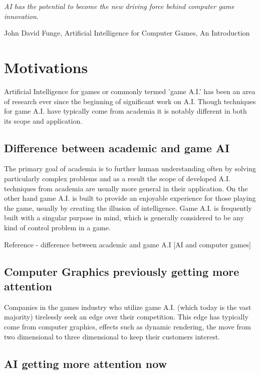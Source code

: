 \documentclass[parskip]{cs4rep}
\begin{document}
\begin{flushleft}
\textit{AI has the potential to become the new driving force behind computer game innovation.}
\end{flushleft}
\begin{flushleft}
John David Funge, Artificial Intelligence for Computer Games, An Introduction
\end{flushleft}

\section{Motivations}

Artificial Intelligence for games or commonly termed 'game A.I.' has been an area of research ever since the beginning of significant work on A.I. Though techniques for game A.I. have typically come from academia it is notably different in both its scope and application.

\subsection{Difference between academic and game AI}

The primary goal of academia is to further human understanding often by solving particularly complex problems and as a result the scope of developed A.I. techniques from academia are usually more general in their application. On the other hand game A.I. is built to provide an enjoyable experience for those playing the game, usually by creating the illusion of intelligence. Game A.I. is frequently built with a singular purpose in mind, which is generally considered to be any kind of control problem in a game.

Reference - difference between academic and game A.I [AI and computer games]

\subsection{Computer Graphics previously getting more attention}

Companies in the games industry who utilize game A.I. (which today is the vast majority) tirelessly seek an edge over their competition. This edge has typically come from computer graphics, effects such as dynamic rendering, the move from two dimensional to three dimensional to keep their customers interest. 

\subsection{AI getting more attention now}
\end{document}

